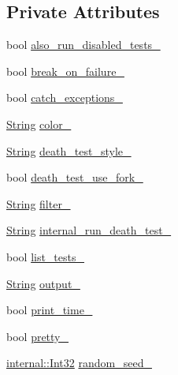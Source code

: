 \subsection*{\-Private \-Attributes}
\begin{DoxyCompactItemize}
\item 
bool \hyperlink{classtesting_1_1internal_1_1GTestFlagSaver_a4c0b47eabe09d8dabd35db7a0dff3abd}{also\-\_\-run\-\_\-disabled\-\_\-tests\-\_\-}
\item 
bool \hyperlink{classtesting_1_1internal_1_1GTestFlagSaver_ad54ec55a62882eba9af161df13b2e7c6}{break\-\_\-on\-\_\-failure\-\_\-}
\item 
bool \hyperlink{classtesting_1_1internal_1_1GTestFlagSaver_ae7865b4eb9284346a5fd86cc41dc5e3f}{catch\-\_\-exceptions\-\_\-}
\item 
\hyperlink{classtesting_1_1internal_1_1String}{\-String} \hyperlink{classtesting_1_1internal_1_1GTestFlagSaver_a960484544270cc1098731bf4f3281302}{color\-\_\-}
\item 
\hyperlink{classtesting_1_1internal_1_1String}{\-String} \hyperlink{classtesting_1_1internal_1_1GTestFlagSaver_a87be734be712cafcf0b42af54fec7599}{death\-\_\-test\-\_\-style\-\_\-}
\item 
bool \hyperlink{classtesting_1_1internal_1_1GTestFlagSaver_afdfd075f51ede227b035ea4c87d050d3}{death\-\_\-test\-\_\-use\-\_\-fork\-\_\-}
\item 
\hyperlink{classtesting_1_1internal_1_1String}{\-String} \hyperlink{classtesting_1_1internal_1_1GTestFlagSaver_a205db14109fb10fed5ac82768abb74d1}{filter\-\_\-}
\item 
\hyperlink{classtesting_1_1internal_1_1String}{\-String} \hyperlink{classtesting_1_1internal_1_1GTestFlagSaver_a0b3341fc7d0f10f5b20c958ffe3fad73}{internal\-\_\-run\-\_\-death\-\_\-test\-\_\-}
\item 
bool \hyperlink{classtesting_1_1internal_1_1GTestFlagSaver_a2c9a3b5435ec6c216b5d39f8c433f173}{list\-\_\-tests\-\_\-}
\item 
\hyperlink{classtesting_1_1internal_1_1String}{\-String} \hyperlink{classtesting_1_1internal_1_1GTestFlagSaver_a78144060f0c1e82ede7b0e7c1533788a}{output\-\_\-}
\item 
bool \hyperlink{classtesting_1_1internal_1_1GTestFlagSaver_adb51b8e5a90edf31c418b2f19895ed27}{print\-\_\-time\-\_\-}
\item 
bool \hyperlink{classtesting_1_1internal_1_1GTestFlagSaver_aaf3ffbe9a6fb39d44564d2a7fc3c9c78}{pretty\-\_\-}
\item 
\hyperlink{namespacetesting_1_1internal_a8d84339888eecdb29b3d8f7607af3ecc}{internal\-::\-Int32} \hyperlink{classtesting_1_1internal_1_1GTestFlagSaver_a176d3c01cee3b31940516079c71880e0}{random\-\_\-seed\-\_\-}

\end{DoxyCompactItemize}
